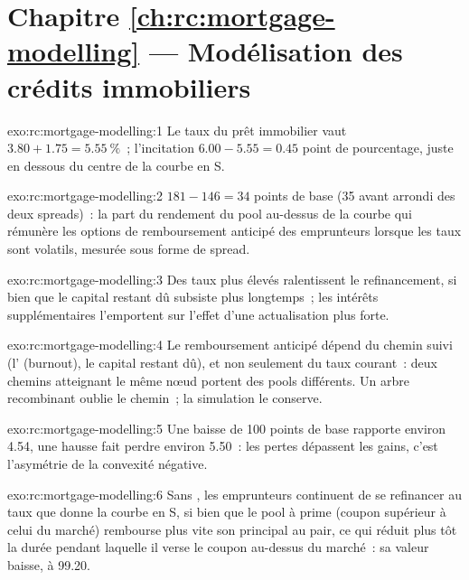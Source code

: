 \section*{Chapitre \ref{ch:rc:mortgage-modelling} --- Modélisation des crédits immobiliers}

\begin{solution}{exo:rc:mortgage-modelling:1}
Le taux du prêt immobilier vaut $3.80+1.75 = 5.55~\%$~; l'incitation $6.00-5.55 = 0.45$ point de pourcentage,
juste en dessous du centre de la courbe en S.
\end{solution}

\begin{solution}{exo:rc:mortgage-modelling:2}
$181-146 = 34$ points de base (35 avant arrondi des deux spreads)~: la part du rendement du pool
au-dessus de la courbe qui rémunère les options de remboursement anticipé des emprunteurs lorsque les taux sont
volatils, mesurée sous forme de spread.
\end{solution}

\begin{solution}{exo:rc:mortgage-modelling:3}
Des taux plus élevés ralentissent le refinancement, si bien que le capital restant dû subsiste plus longtemps~;
les intérêts supplémentaires l'emportent sur l'effet d'une actualisation plus forte.
\end{solution}

\begin{solution}{exo:rc:mortgage-modelling:4}
Le remboursement anticipé dépend du chemin suivi (l' (burnout), le capital restant dû), et non seulement du taux
courant~: deux chemins atteignant le même nœud portent des pools différents. Un arbre recombinant oublie
le chemin~; la simulation le conserve.
\end{solution}

\begin{solution}{exo:rc:mortgage-modelling:5}
Une baisse de 100 points de base rapporte environ 4.54, une hausse fait perdre environ 5.50~: les pertes dépassent les
gains, c'est l'asymétrie de la convexité négative.
\end{solution}

\begin{solution}{exo:rc:mortgage-modelling:6}
Sans , les emprunteurs continuent de se refinancer au taux que donne la courbe en S, si bien que le pool
à prime (coupon supérieur à celui du marché) rembourse plus vite son principal au pair, ce qui réduit plus tôt
la durée pendant laquelle il verse le coupon au-dessus du marché~: sa valeur baisse, à 99.20.
\end{solution}

